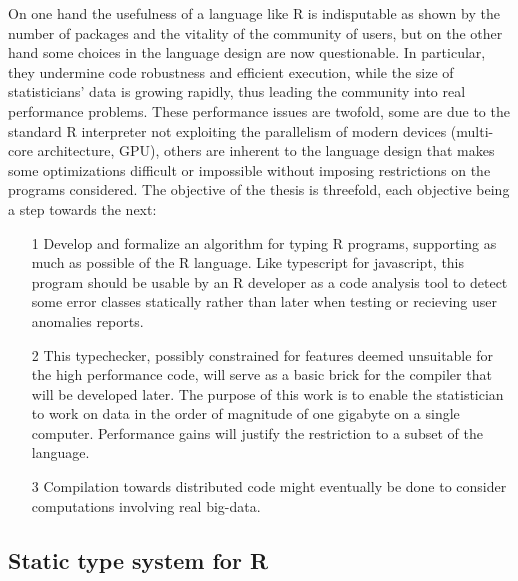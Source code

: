 On one hand the usefulness of a language like R is indisputable as shown by the number of packages and the vitality of the community of users, but on the other hand some choices in the language design are now questionable. In particular, they undermine code robustness and efficient execution, while the size of statisticians' data is growing rapidly, thus leading the community into real performance problems. These performance issues are twofold, some are due to the standard R interpreter not exploiting the parallelism of modern devices (multi-core architecture, GPU), others are inherent to the language design that makes some optimizations difficult or impossible without imposing restrictions on the programs considered.
The objective of the thesis is threefold, each objective being a step towards the next:
\begin{enumerate}
\item[1] Develop and formalize an algorithm for typing R programs, supporting as much as possible of the R language. Like typescript for javascript, this program should be usable by an R developer as a code analysis tool to detect some error classes statically rather than later when testing or recieving user anomalies reports.
\item[2] This typechecker, possibly constrained for features deemed unsuitable for the high performance code, will serve as a basic brick for the compiler that will be developed later. The purpose of this work is to enable the statistician to work on data in the order of magnitude of one gigabyte on a single computer. Performance gains will justify the restriction to a subset of the language.
\item[3] Compilation towards distributed code might eventually be done to consider computations involving real big-data.\\
\end{enumerate}

\subsection{Static type system for R}


